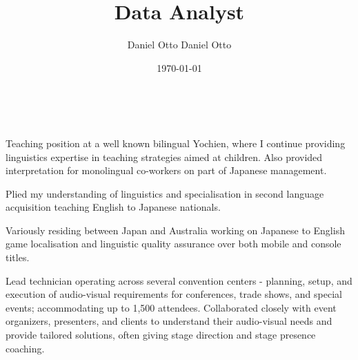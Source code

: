 \documentclass[10pt,a4paper,ragged2e,withhyper]{altacv}
\author{Daniel Otto Daniel Otto}
\date{\today}
\title{Data Analyst}
\begin{document}

\makecvheader

​\begin{paracol}{2}

\label{sec:org9e469e5}
Teaching position at a well known bilingual Yochien, where I continue providing linguistics expertise in teaching strategies aimed at children. Also provided interpretation for monolingual co-workers on part of Japanese management.
\par\divider
{}
Plied my understanding of linguistics and specialisation in second language acquisition teaching English to Japanese nationals.
\par\divider
{}
Variously residing between Japan and Australia working on Japanese to English game localisation and linguistic quality assurance over both mobile and console titles.
\par\divider
{}
Lead technician operating across several convention centers - planning, setup, and execution of audio-visual requirements for conferences, trade shows, and special events; accommodating up to 1,500 attendees. Collaborated closely with event organizers, presenters, and clients to understand their audio-visual needs and provide tailored solutions, often giving stage direction and stage presence coaching.


\end{paracol}
\end{document}
